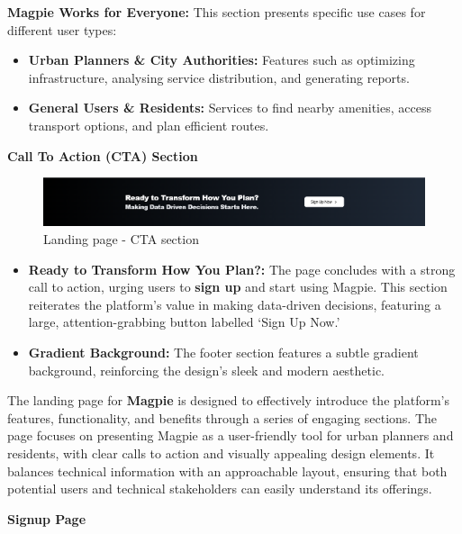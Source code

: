 \textbf{Magpie Works for Everyone:} This section presents specific use cases for different user types:
\begin{itemize}
    \item{}  \textbf{Urban Planners \& City Authorities:} Features such as optimizing infrastructure, analysing service distribution, and generating reports.
    \item{} \textbf{General Users \& Residents:} Services to find nearby amenities, access transport options, and plan efficient routes.
\end{itemize}

\textbf{Call To Action (CTA) Section}

\begin{figure}[h]
    \centering{}
    \includegraphics[width=1\textwidth]{images/site/landing/landing_5_cta.png}
    \caption{Landing page {-} CTA section}
\end{figure}

\begin{itemize}
    \item{} \textbf{Ready to Transform How You Plan?:} The page concludes with a strong call to action, urging users to \textbf{sign up} and start using Magpie. This section reiterates the platform's value in making data{-}driven decisions, featuring a large, attention{-}grabbing button labelled `Sign Up Now.'
    \item{} \textbf{Gradient Background:} The footer section features a subtle gradient background, reinforcing the design's sleek and modern aesthetic.
\end{itemize}

The landing page for \textbf{Magpie} is designed to effectively introduce the platform’s features, functionality, and benefits through a series of engaging sections. The page focuses on presenting Magpie as a user{-}friendly tool for urban planners and residents, with clear calls to action and visually appealing design elements. It balances technical information with an approachable layout, ensuring that both potential users and technical stakeholders can easily understand its offerings.

\newpage{}

\textbf{Signup Page}

